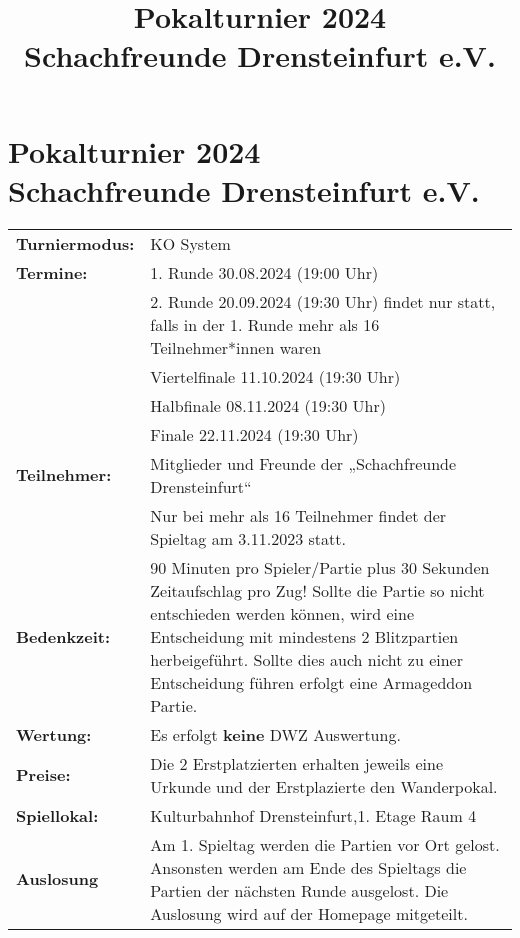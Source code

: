 \documentclass[a4paper,parskip=full-,DIV18]{scrartcl}
\title{Pokalturnier 2024\\Schachfreunde Drensteinfurt e.V.}
\begin{document}
\section*{Pokalturnier 2024\\Schachfreunde Drensteinfurt e.V.}

\begin{tabular}{p{3 cm} p{13.5 cm}}
	\textbf{Turniermodus:} & KO System                                                                                 \\
	\textbf{Termine:}      & 1. Runde   30.08.2024 (19:00 Uhr)                                           \\
	                       & 2. Runde   20.09.2024 (19:30 Uhr) findet nur statt, falls in der 1. Runde mehr als 16 Teilnehmer*innen waren                                          \\
	                       & Viertelfinale 11.10.2024 (19:30 Uhr)                                                   \\
	                       & Halbfinale 08.11.2024 (19:30 Uhr)                                                          \\
	                       & Finale 22.11.2024 (19:30 Uhr)                                                          \\
	\textbf{Teilnehmer:}   & Mitglieder und Freunde der „Schachfreunde Drensteinfurt“                                   \\
	\textbf{}              & Nur bei mehr als 16 Teilnehmer findet der Spieltag am 3.11.2023 statt. \\
	\textbf{Bedenkzeit:}   & 90 Minuten pro Spieler/Partie plus 30 Sekunden Zeitaufschlag pro Zug! Sollte die Partie so nicht entschieden werden können, wird eine Entscheidung mit  mindestens 2 Blitzpartien herbeigeführt. Sollte dies auch nicht zu einer Entscheidung führen erfolgt eine Armageddon Partie.                     \\
	\textbf{Wertung:}      & Es erfolgt \textbf{keine} DWZ Auswertung.                                                  \\
	\textbf{Preise:}       & Die 2 Erstplatzierten erhalten jeweils eine Urkunde und der Erstplazierte den Wanderpokal. \\
	\textbf{Spiellokal:}   & Kulturbahnhof Drensteinfurt,1. Etage Raum 4\\
    \textbf {Auslosung} & Am 1. Spieltag werden die Partien vor Ort gelost. Ansonsten werden am Ende des Spieltags die Partien der nächsten Runde ausgelost. Die Auslosung wird auf der Homepage mitgeteilt.\\

\end{tabular}
\end{document}
